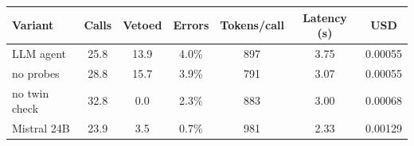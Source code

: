 \begin{tabular}{@{}lcccccc@{}}
\toprule
Variant & Calls & Vetoed & Errors & Tokens/call & Latency (s) & USD \\
\midrule
LLM agent & 25.8 & 13.9 & 4.0\% & 897 & 3.75 & 0.00055 \\
no probes & 28.8 & 15.7 & 3.9\% & 791 & 3.07 & 0.00055 \\
no twin check & 32.8 & 0.0 & 2.3\% & 883 & 3.00 & 0.00068 \\
Mistral 24B & 23.9 & 3.5 & 0.7\% & 981 & 2.33 & 0.00129 \\
\bottomrule
\end{tabular}
